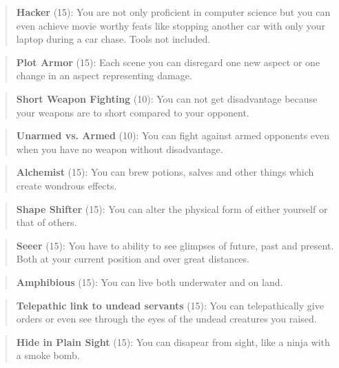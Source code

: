 \documentclass[11pt]{article}
\begin{document}
{\begin{quote}
\textbf{Hacker} (15): You are not only proficient in computer science but you can even achieve movie worthy feats like stopping another car with only your laptop during a car chase. Tools not included.
\end{quote}

\begin{quote}
\textbf{Plot Armor} (15): Each scene you can disregard one new aspect or one change in an aspect representing damage. 
\end{quote}

\begin{quote}
\textbf{Short Weapon Fighting} (10): You can not get disadvantage because your weapons are to short compared to your opponent.
\end{quote}

\begin{quote}
\textbf{Unarmed vs. Armed} (10): You can fight against armed opponents even when you have no weapon without disadvantage.
\end{quote}

\begin{quote}
\textbf{Alchemist} (15): You can brew potions, salves and other things which create wondrous effects.
\end{quote}

\begin{quote}
\textbf{Shape Shifter} (15): You can alter the physical form of either yourself or that of others.
\end{quote}

\begin{quote}
\textbf{Seeer} (15): You have to ability to see glimpses of future, past and present. Both at your current position and over great distances. 
\end{quote}

\begin{quote}
\textbf{Amphibious} (15): You can live both underwater and on land.
\end{quote}

\begin{quote}
\textbf{Telepathic link to undead servants} (15): You can telepathically give orders or even see through the eyes of the undead creatures you raised. 
\end{quote}

\begin{quote}
\textbf{Hide in Plain Sight} (15): You can disapear from sight, like a ninja with a smoke bomb.
\end{quote}
}
\end{document}
